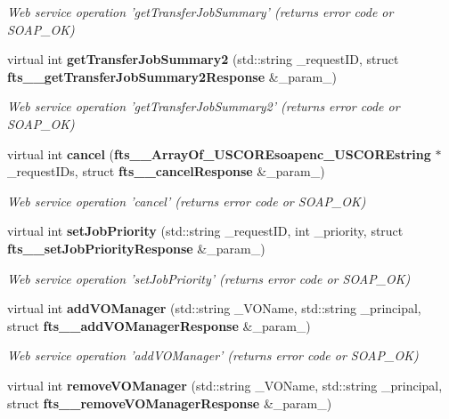 \begin{DoxyCompactItemize}
\begin{DoxyCompactList}\small\item\em Web service operation 'getTransferJobSummary' (returns error code or SOAP\_\-OK) \item\end{DoxyCompactList}\item 
virtual int {\bf getTransferJobSummary2} (std::string \_\-requestID, struct {\bf fts\_\-\_\-getTransferJobSummary2Response} \&\_\-param\_)\label{classFileTransferSoapBindingProxy_ae5020f5f86dad6df99cb78f2016fa4fa}

\begin{DoxyCompactList}\small\item\em Web service operation 'getTransferJobSummary2' (returns error code or SOAP\_\-OK) \item\end{DoxyCompactList}\item 
virtual int {\bf cancel} ({\bf fts\_\-\_\-ArrayOf\_\-USCOREsoapenc\_\-USCOREstring} $\ast$\_\-requestIDs, struct {\bf fts\_\-\_\-cancelResponse} \&\_\-param\_)\label{classFileTransferSoapBindingProxy_a7e58779d348e7f0c2fb5055bf1ba41f0}

\begin{DoxyCompactList}\small\item\em Web service operation 'cancel' (returns error code or SOAP\_\-OK) \item\end{DoxyCompactList}\item 
virtual int {\bf setJobPriority} (std::string \_\-requestID, int \_\-priority, struct {\bf fts\_\-\_\-setJobPriorityResponse} \&\_\-param\_)\label{classFileTransferSoapBindingProxy_a93caae826874a4234879d9826c9df44a}

\begin{DoxyCompactList}\small\item\em Web service operation 'setJobPriority' (returns error code or SOAP\_\-OK) \item\end{DoxyCompactList}\item 
virtual int {\bf addVOManager} (std::string \_\-VOName, std::string \_\-principal, struct {\bf fts\_\-\_\-addVOManagerResponse} \&\_\-param\_)\label{classFileTransferSoapBindingProxy_a8a966889f59e32fc31906cf1ea6fd65c}

\begin{DoxyCompactList}\small\item\em Web service operation 'addVOManager' (returns error code or SOAP\_\-OK) \item\end{DoxyCompactList}\item 
virtual int {\bf removeVOManager} (std::string \_\-VOName, std::string \_\-principal, struct {\bf fts\_\-\_\-removeVOManagerResponse} \&\_\-param\_)\label{classFileTransferSoapBindingProxy_a13e9478640954f1a1dbb2a5d2dfebb52}


\end{DoxyCompactItemize}
